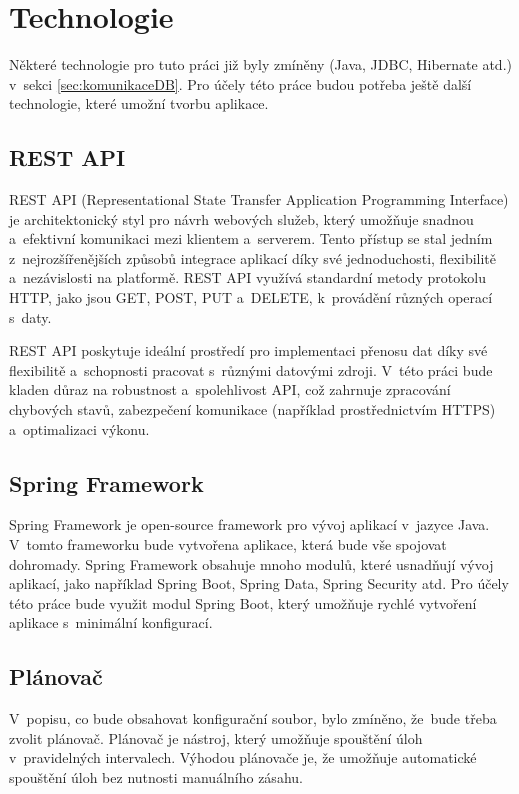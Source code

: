 \chapter{Technologie}

Některé technologie pro tuto práci již byly zmíněny (Java, JDBC, Hibernate atd.) v~sekci \ref{sec:komunikaceDB}.  
Pro účely této práce budou potřeba ještě další technologie, které umožní tvorbu aplikace.

\section{REST API}

REST API (Representational State Transfer Application Programming Interface) je architektonický  
styl pro návrh webových služeb, který umožňuje snadnou a~efektivní komunikaci mezi klientem a~serverem.  
Tento přístup se stal jedním z~nejrozšířenějších způsobů integrace aplikací díky své jednoduchosti,  
flexibilitě a~nezávislosti na platformě. REST API využívá standardní metody protokolu HTTP, jako jsou  
GET, POST, PUT a~DELETE, k~provádění různých operací s~daty.

REST API poskytuje ideální prostředí pro implementaci přenosu dat díky své flexibilitě a~schopnosti  
pracovat s~různými datovými zdroji. V~této práci bude kladen důraz na robustnost a~spolehlivost API,  
což zahrnuje zpracování chybových stavů, zabezpečení komunikace (například prostřednictvím HTTPS)  
a~optimalizaci výkonu.  
\cite{rest_api}

\section{Spring Framework}

Spring Framework je open-source framework pro vývoj aplikací v~jazyce Java.  
V~tomto frameworku bude vytvořena aplikace, která bude vše spojovat dohromady.  
Spring Framework obsahuje mnoho modulů, které usnadňují vývoj aplikací,  
jako například Spring Boot, Spring Data, Spring Security atd.  
Pro účely této práce bude využit modul Spring Boot, který umožňuje rychlé  
vytvoření aplikace s~minimální konfigurací.  
\cite{spring_framework}

\newpage
\section{Plánovač}

V~popisu, co bude obsahovat konfigurační soubor, bylo zmíněno, že~bude třeba zvolit plánovač.  
Plánovač je nástroj, který umožňuje spouštění úloh v~pravidelných intervalech.  
Výhodou plánovače je, že umožňuje automatické spouštění úloh bez nutnosti manuálního zásahu.  

